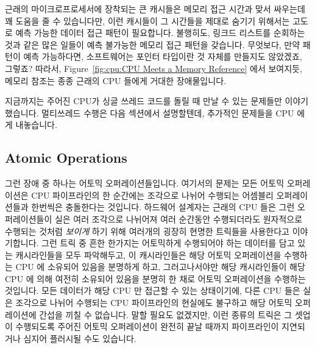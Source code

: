 근래의 마이크로프로세서에 장착되는 큰 캐시들은 메모리 접근 시간과 맞서 싸우는데
꽤 도움을 줄 수 있습니다만, 이런 캐시들이 그 시간들을 제대로 숨기기 위해서는
고도로 예측 가능한 데이터 접근 패턴이 필요합니다.
불행히도, 링크드 리스트를 순회하는 것과 같은 많은 일들이 예측 불가능한 메모리
접근 패턴을 갖습니다. 무엇보다, 만약 패턴이 예측 가능하다면, 소프트웨어는
포인터 타입이란 것 자체를 만들지도 않았겠죠, 그렇죠?
따라서, Figure~\ref{fig:cpu:CPU Meets a Memory Reference} 에서 보여지듯, 메모리
참조는 종종 근래의 CPU 들에게 거대한 장애물입니다.

지금까지는 주어진 CPU가 싱글 쓰레드 코드를 돌릴 때 만날 수 있는 문제들만
이야기했습니다.
멀티쓰레드 수행은 다음 섹션에서 설명할텐데, 추가적인 문제들을 CPU 에게
내놓습니다.

\subsection{Atomic Operations}
\label{sec:cpu:Atomic Operations}

그런 장애 중 하나는 어토믹 오퍼레이션들입니다.
여기서의 문제는 모든 어토믹 오퍼레이션은 CPU 파이프라인의 한 순간에는 조각으로
나뉘어 수행되는 어셈블리 오퍼레이션들과 한번씩은 충돌한다는 것입니다.
하드웨어 설계자는 근래의 CPU 들은 그런 오퍼레이션들이 실은 여러 조각으로
나뉘어져 여러 순간동안 수행되더라도 원자적으로 수행되는 것처럼 \emph{보이게}
하기 위해 여러개의 굉장히 현명한 트릭들을 사용한다고 이야기합니다. 그런 트릭 중
흔한 한가지는 어토믹하게 수행되어야 하는 데이터를 담고 있는 캐시라인들을 모두
파악해두고, 이 캐시라인들은 해당 어토믹 오퍼레이션을 수행하는 CPU 에 소유되어
있음을 분명하게 하고, 그러고나서야만 해당 캐시라인들이 해당 CPU 에 의해 여전히
소유되어 있음을 분명히 한 채로 어토믹 오퍼레이션을 수행하는 것입니다.
모든 데이터가 해당 CPU 만 접근할 수 있는 상태이기에, 다른 CPU 들은 실은
조각으로 나뉘어 수행되는 CPU 파이프라인의 현실에도 불구하고 해당 어토믹
오퍼레이션에 간섭을 끼칠 수 없습니다.
말할 필요도 없겠지만, 이런 종류의 트릭은 그 셋업이 수행되도록 주어진 어토믹
오퍼레이션이 완전히 끝날 때까지 파이프라인이 지연되거나 심지어 플러시될 수도
있습니다.

